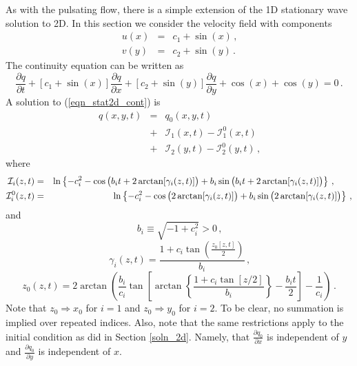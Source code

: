 \documentclass[11pt]{book}
\begin{document}
As with the pulsating flow, there is a simple extension of the 1D stationary wave solution to 2D.  In this section we consider the velocity field with components
\begin{eqnarray}
u(x) &=& c_1 + \sin(x) \,\mbox{,} \\
v(y) &=& c_2 + \sin(y) \,\mbox{.}
\end{eqnarray}
The continuity equation can be written as
\begin{equation}
\label{eqn_stat2d_cont}
\frac{\partial q}{\partial t} + [c_1 + \sin(x)] \frac{\partial q}{\partial x} + [c_2 + \sin(y)] \frac{\partial q}{\partial y} + \cos(x) + \cos(y) = 0 \,\mbox{.}
\end{equation}
A solution to (\ref{eqn_stat2d_cont}) is
\begin{eqnarray}
\label{eqn_stat2d_soln}
q(x,y,t) &=& q_0(x,y,t) \nonumber\\
&+& \mathcal{I}_1(x,t) - \mathcal{I}_1^0(x,t) \nonumber\\
&+& \mathcal{I}_2(y,t) - \mathcal{I}_2^0(y,t) \,\mbox{,}
\end{eqnarray}
where
\begin{eqnarray}
\label{eqn_Ii}
\mathcal{I}_i(z,t) &=& \ln\left\{ -c_i^2 - \cos\big(b_i t + 2\arctan[\gamma_i(z,t)] \big) + b_i \sin\big(b_i t + 2\arctan[\gamma_i(z,t)] \big) \right\}\,\mbox{,} \quad\quad  \vspace{0.3cm}\\
\label{eqn_Ii0}
\mathcal{I}_i^0(z,t) &=& \ln\left\{ -c_i^2 - \cos\big(2\arctan[\gamma_i(z,t)] \big) + b_i \sin\big(2\arctan[\gamma_i(z,t)] \big) \right\} \,\mbox{,}
\end{eqnarray}
and
\begin{equation}
b_i \equiv \sqrt{-1 + c_i^2} >0 \,\mbox{,}
\end{equation}
\begin{equation}
\gamma_i(z,t) = \frac{ 1 + c_i \tan\left( \frac{z_0[z,t]}{2} \right) }{b_i} \,\mbox{,}
\end{equation}
\begin{equation}
z_0(z,t) = 2\arctan\left( \frac{b_i}{c_i} \tan \left[ \arctan\left\{ \frac{1+c_i\tan[z/2]}{b_i} \right\} - \frac{b_it}{2} \right] - \frac{1}{c_i} \right) \,\mbox{.}
\end{equation}
Note that $z_0 \Rightarrow x_0$ for $i=1$ and $z_0 \Rightarrow y_0$ for $i=2$.  To be clear, no summation is implied over repeated indices. Also, note that the same restrictions apply to the initial condition as did in Section \ref{soln_2d}. Namely, that $\frac{\partial q_0}{\partial x}$ is independent of $y$ and $\frac{\partial q_0}{\partial y}$ is independent of $x$.
\end{document}
